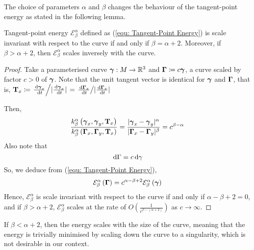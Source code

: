 \documentclass[../dissertation.tex]{subfiles}
\begin{document}
The choice of parameters $\alpha$ and $\beta$ changes the behaviour of the tangent-point energy as stated in the following lemma.
\begin{lemma}
    Tangent-point energy $\mathcal{E}_{\beta}^{\alpha}$ defined as (\ref{equ: Tangent-Point Energy}) is scale invariant with respect to the curve if and only if $\beta = \alpha + 2$.
    Moreover, if $\beta > \alpha + 2$, then $\mathcal{E}_{\beta}^{\alpha}$ scales inversely with the curve.
    \begin{proof}
        Take a parameterised curve $\boldsymbol{\gamma}:M \rightarrow \mathbb{R}^3$ and $\boldsymbol{\Gamma} \coloneqq c \boldsymbol{\gamma}$, a curve scaled by factor $c>0$ of $\boldsymbol{\gamma}$.
        Note that the unit tangent vector is identical for $\boldsymbol{\gamma}$ and $\boldsymbol{\Gamma}$, that is, $\mathbf{T}_x \coloneqq \left. \frac{\, \text{d} \boldsymbol{\gamma}_x}{\, \text{d} t} \middle/ \lvert\frac{\, \text{d} \boldsymbol{\gamma}_x}{\, \text{d} t}\lvert \right. = \left. \frac{\, \text{d} \boldsymbol{\Gamma}_x}{\, \text{d} t} \middle/ \lvert\frac{\, \text{d} \boldsymbol{\Gamma}_x}{\, \text{d} t}\lvert \right. $

        Then,
        \begin{equation}
            \frac{k_{\beta}^{\alpha} \left( \boldsymbol{\gamma}_x, \boldsymbol{\gamma}_y, \mathbf{T}_x \right)}{k_{\beta}^{\alpha} \left( \boldsymbol{\Gamma}_x, \boldsymbol{\Gamma}_y, \mathbf{T}_x \right)}
            =
            \frac{\lvert\boldsymbol{\gamma}_x - \boldsymbol{\gamma}_y\lvert^{\alpha}}{\lvert\boldsymbol{\Gamma}_x - \boldsymbol{\Gamma}_y\lvert^{\beta}} = c^{\beta - \alpha}
        \end{equation}
        Also note that
        \begin{equation}
            \, \text{d} \Gamma = c \, \text{d} \gamma
        \end{equation}
        So, we deduce from (\ref{equ: Tangent-Point Energy}),
        \begin{equation}
            \mathcal{E}_{\beta}^{\alpha} \left( \boldsymbol{\Gamma} \right) = c^{\alpha - \beta + 2} \mathcal{E}_{\beta}^{\alpha} \left( \boldsymbol{\gamma} \right)
        \end{equation}
        Hence, $\mathcal{E}_{\beta}^{\alpha}$ is scale invariant with respect to the curve if and only if $\alpha - \beta + 2 = 0$, and if $\beta > \alpha + 2$, $\mathcal{E}_{\beta}^{\alpha}$ scales at the rate of $O\left( \frac{1}{c^{\beta - \left( \alpha + 2 \right)}} \right)$ as $c \rightarrow \infty$.
    \end{proof}
\end{lemma}

\begin{remark}
    If $\beta < \alpha + 2$, then the energy scales with the size of the curve,
    meaning that the energy is trivially minimised by scaling down the curve to a singularity,
    which is not desirable in our context.
\end{remark}
\end{document}
